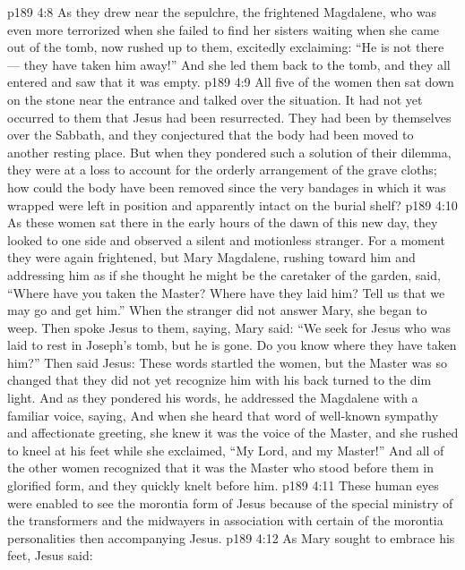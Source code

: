 \vs p189 4:8 As they drew near the sepulchre, the frightened Magdalene, who was even more terrorized when she failed to find her sisters waiting when she came out of the tomb, now rushed up to them, excitedly exclaiming: “He is not there --- they have taken him away!” And she led them back to the tomb, and they all entered and saw that it was empty.
\vs p189 4:9 All five of the women then sat down on the stone near the entrance and talked over the situation. It had not yet occurred to them that Jesus had been resurrected. They had been by themselves over the Sabbath, and they conjectured that the body had been moved to another resting place. But when they pondered such a solution of their dilemma, they were at a loss to account for the orderly arrangement of the grave cloths; how could the body have been removed since the very bandages in which it was wrapped were left in position and apparently intact on the burial shelf?
\vs p189 4:10 \pc As these women sat there in the early hours of the dawn of this new day, they looked to one side and observed a silent and motionless stranger. For a moment they were again frightened, but Mary Magdalene, rushing toward him and addressing him as if she thought he might be the caretaker of the garden, said, “Where have you taken the Master? Where have they laid him? Tell us that we may go and get him.” When the stranger did not answer Mary, she began to weep. Then spoke Jesus to them, saying,  Mary said: “We seek for Jesus who was laid to rest in Joseph’s tomb, but he is gone. Do you know where they have taken him?” Then said Jesus:  These words startled the women, but the Master was so changed that they did not yet recognize him with his back turned to the dim light. And as they pondered his words, he addressed the Magdalene with a familiar voice, saying,  And when she heard that word of well\hyp{}known sympathy and affectionate greeting, she knew it was the voice of the Master, and she rushed to kneel at his feet while she exclaimed, “My Lord, and my Master!” And all of the other women recognized that it was the Master who stood before them in glorified form, and they quickly knelt before him.
\vs p189 4:11 These human eyes were enabled to see the morontia form of Jesus because of the special ministry of the transformers and the midwayers in association with certain of the morontia personalities then accompanying Jesus.
\vs p189 4:12 \pc As Mary sought to embrace his feet, Jesus said: 
